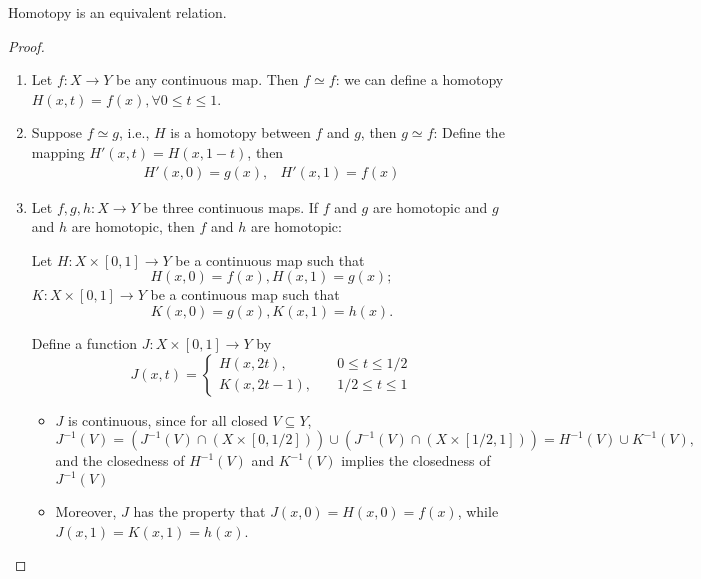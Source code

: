 \begin{proposition}
Homotopy is an equivalent relation.
\end{proposition}
\begin{proof}
\begin{enumerate}
\item
Let $f:X\to Y$ be any continuous map. Then $f\simeq f$:
we can define a homotopy $H(x,t) = f(x),\forall 0\le t\le 1$.
\item
Suppose $f\simeq g$, i.e., $H$ is a homotopy between $f$ and $g$, then $g\simeq f$:
Define the mapping $H'(x,t) = H(x,1-t)$, 
then 
\[
\begin{array}{ll}
H'(x,0)=g(x),
&
H'(x,1)=f(x)
\end{array}
\]
\item
Let $f,g,h:X\to Y$ be three continuous maps.
If $f$ and $g$ are homotopic and $g$ and $h$ are homotopic, then $f$ and $h$ are homotopic:

Let $H:X\times[0,1]\to Y$ be a continuous map such that 
\[
H(x,0)=f(x),H(x,1)=g(x);
\]
$K:X\times[0,1]\to Y$ be a continuous map such that 
\[
K(x,0)=g(x),K(x,1)=h(x).
\]

Define a function $J:X\times[0,1]\to Y$ by
\[
J(x,t)=\left\{
\begin{aligned}
H(x,2t),&\quad 0\le t\le1/2\\
K(x,2t-1),&\quad 1/2\le t\le 1
\end{aligned}
\right.
\]
\begin{itemize}
\item
$J$ is continuous, since for all closed $V\subseteq Y$,
\[
J^{-1}(V)=(J^{-1}(V)\cap(X\times[0,1/2]))\cup(J^{-1}(V)\cap(X\times[1/2,1]))
=
H^{-1}(V)\cup K^{-1}(V),
\]
and the closedness of $H^{-1}(V)$ and $K^{-1}(V)$ implies the closedness of $J^{-1}(V)$
\item
Moreover, $J$ has the property that $J(x,0)=H(x,0)=f(x)$, while $J(x,1)=K(x,1)=h(x)$.
\end{itemize}
\end{enumerate}
\end{proof}




%
%
%

